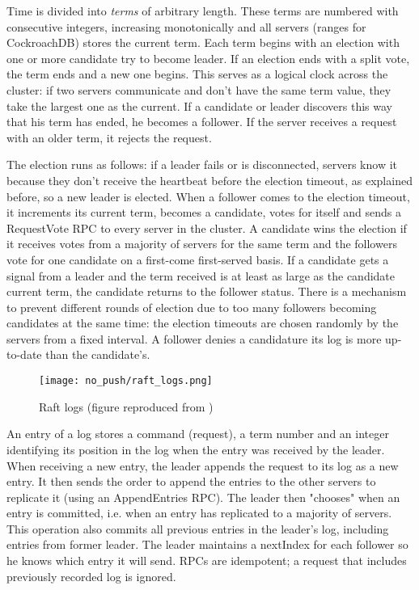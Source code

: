 Time is divided into \emph{terms} of arbitrary length. These terms are numbered with consecutive integers, increasing monotonically and all servers (ranges for CockroachDB) stores the current term. Each term begins with an election with one or more candidate try to become leader. If an election ends with a split vote, the term ends and a new one begins. This serves as a logical clock across the cluster: if two servers communicate and don't have the same term value, they take the largest one as the current. If a candidate or leader discovers this way that his term has ended, he becomes a follower. If the server receives a request with an older term, it rejects the request.

The election runs as follows: if a leader fails or is disconnected, servers know it because they don't receive the heartbeat before the election timeout, as explained before, so a new leader is elected. When a follower comes to the election timeout, it increments its current term, becomes a candidate, votes for itself and sends a RequestVote RPC to every server in the cluster. A candidate wins the election if it receives votes from a majority of servers for the same term and the followers vote for one candidate on a first-come first-served basis. If a candidate gets a signal from a leader and the term received is at least as large as the candidate current term, the candidate returns to the follower status. There is a mechanism to prevent different rounds of election due to too many followers becoming candidates at the same time: the election timeouts are chosen randomly by the servers from a fixed interval. A follower denies a candidature its log is more up-to-date than the candidate's.

\begin{figure}[H]
  \vspace{-10pt}
  \centering
  \centerline{\texttt{[image: no\_push/raft\_logs.png]}}
  \vspace{-5pt}
  \caption{Raft logs (figure reproduced from \cite{DBLP:conf/usenix/OngaroO14})}
  \vspace{-5pt}
  \label{fig:raft-log}
\end{figure}


An entry of a log stores a command (request), a term number and an integer identifying its position in the log when the entry was received by the leader. When receiving a new entry, the leader appends the request to its log as a new entry. It then sends the order to append the entries to the other servers to replicate it (using an AppendEntries RPC). The leader then "chooses" when an entry is committed, i.e. when an entry has replicated to a majority of servers. This operation also commits all previous entries in the leader's log, including entries from former leader. The leader maintains a nextIndex for each follower so he knows which entry it will send. RPCs are idempotent; a request that includes previously recorded log is ignored.


